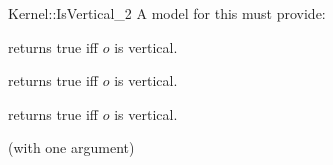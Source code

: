 \begin{ccRefFunctionObjectConcept}{Kernel::IsVertical_2}
A model for this must provide:


{returns true iff $o$ is vertical.}

{returns true iff $o$ is vertical.}

{returns true iff $o$ is vertical.}

\ccRefines
{} (with one argument)

\ccSeeAlso
{} \\
 \\
 \\

\end{ccRefFunctionObjectConcept}
